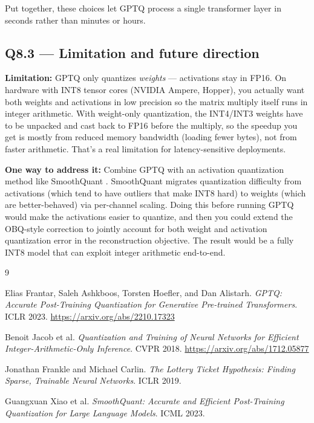 \documentclass[11pt]{article}
\begin{document}
Put together, these choices let GPTQ process a single transformer layer in seconds rather than minutes or hours.

\subsection{Q8.3 --- Limitation and future direction}

\textbf{Limitation:} GPTQ only quantizes \emph{weights} --- activations stay in FP16. On hardware with INT8 tensor cores (NVIDIA Ampere, Hopper), you actually want both weights and activations in low precision so the matrix multiply itself runs in integer arithmetic. With weight-only quantization, the INT4/INT3 weights have to be unpacked and cast back to FP16 before the multiply, so the speedup you get is mostly from reduced memory bandwidth (loading fewer bytes), not from faster arithmetic. That's a real limitation for latency-sensitive deployments.

\textbf{One way to address it:} Combine GPTQ with an activation quantization method like SmoothQuant \cite{xiao2023smoothquant}. SmoothQuant migrates quantization difficulty from activations (which tend to have outliers that make INT8 hard) to weights (which are better-behaved) via per-channel scaling. Doing this before running GPTQ would make the activations easier to quantize, and then you could extend the OBQ-style correction to jointly account for both weight and activation quantization error in the reconstruction objective. The result would be a fully INT8 model that can exploit integer arithmetic end-to-end.

\begin{thebibliography}{9}

Elias Frantar, Saleh Ashkboos, Torsten Hoefler, and Dan Alistarh.
\textit{GPTQ: Accurate Post-Training Quantization for Generative Pre-trained Transformers}.
ICLR 2023. \url{https://arxiv.org/abs/2210.17323}

Benoit Jacob et al.
\textit{Quantization and Training of Neural Networks for Efficient Integer-Arithmetic-Only Inference}.
CVPR 2018. \url{https://arxiv.org/abs/1712.05877}

Jonathan Frankle and Michael Carlin.
\textit{The Lottery Ticket Hypothesis: Finding Sparse, Trainable Neural Networks}.
ICLR 2019.

Guangxuan Xiao et al.
\textit{SmoothQuant: Accurate and Efficient Post-Training Quantization for Large Language Models}.
ICML 2023.

\end{thebibliography}
\end{document}
